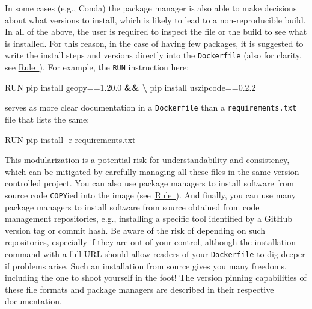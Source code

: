 \documentclass[10pt,letterpaper]{article}
\newenvironment{Shaded}{\begin{snugshade}}{\end{snugshade}}
\newcommand{\ExtensionTok}[1]{#1}
\newcommand{\KeywordTok}[1]{\textcolor[rgb]{0.13,0.29,0.53}{\textbf{#1}}}
\newcommand{\NormalTok}[1]{#1}
\begin{document}
In some cases (e.g., Conda) the package manager is also able to make
decisions about what versions to install, which is likely to lead to a
non-reproducible build. In all of the above, the user is required to
inspect the file or the build to see what is installed. For this reason,
in the case of having few packages, it is suggested to write the install
steps and versions directly into the \texttt{Dockerfile} (also for
clarity, see \hyperref[{rule:clarity}]{Rule~}).
For example, the \texttt{RUN} instruction here:

\footnotesize

\begin{Shaded}
\begin{Highlighting}[]
\ExtensionTok{RUN}\NormalTok{ pip install geopy==1.20.0 }\KeywordTok{&&} \KeywordTok{\textbackslash{}}
    \ExtensionTok{pip}\NormalTok{ install uszipcode==0.2.2}
\end{Highlighting}
\end{Shaded}

\normalsize

serves as more clear documentation in a \texttt{Dockerfile} than a
\texttt{requirements.txt} file that lists the same:

\footnotesize

\begin{Shaded}
\begin{Highlighting}[]
\ExtensionTok{RUN}\NormalTok{ pip install -r requirements.txt}
\end{Highlighting}
\end{Shaded}

\normalsize

This modularization is a potential risk for understandability and
consistency, which can be mitigated by carefully managing all these
files in the same version-controlled project. You can also use package
managers to install software from source code \texttt{COPY}ied into the
image (see~\hyperref[{rule:mount}]{Rule~}). And
finally, you can use many package managers to install software from
source obtained from code management repositories, e.g., installing a
specific tool identified by a GitHub version tag or commit hash. Be
aware of the risk of depending on such repositories, especially if they
are out of your control, although the installation command with a full
URL should allow readers of your \texttt{Dockerfile} to dig deeper if
problems arise. Such an installation from source gives you many
freedoms, including the one to shoot yourself in the foot! The version
pinning capabilities of these file formats and package managers are
described in their respective documentation.
\end{document}
